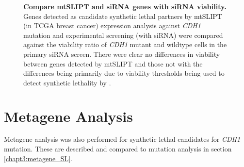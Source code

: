 \begin{figure}[!htp]
\begin{mdframed}
\begin{center}
   \end{center}
   \caption[Compare mtSLIPT and siRNA genes with siRNA viability]{\small \textbf{Compare mtSLIPT and siRNA genes with siRNA viability.}  Genes detected as candidate synthetic lethal partners by mtSLIPT (in TCGA breast cancer) expression analysis against \textit{CDH1} mutation and experimental screening (with siRNA) were compared against the viability ratio of \textit{CDH1} mutant and wildtype cells in the primary siRNA screen. There were clear no differences in viability between genes detected by mtSLIPT and those not with the differences being primarily due to viability thresholds being used to detect synthetic lethality by \citet{Telford2015}. 
}
\label{fig:compare_viability_mtSL}
\end{mdframed}
\end{figure}


\clearpage
\section{Metagene Analysis} \label{chapt3:metagene_mtSL}

Metagene analysis was also performed for synthetic lethal candidates for \textit{CDH1} mutation. These are described and compared to mutation analysis in section \ref{chapt3:metagene_SL}. 


